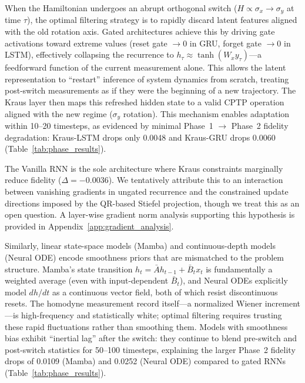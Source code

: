 \documentclass{article} %
\begin{document}
When the Hamiltonian undergoes an abrupt orthogonal switch ($H \propto \sigma_x \to \sigma_y$ at time $\tau$), the optimal filtering strategy is to rapidly discard latent features aligned with the old rotation axis. Gated architectures achieve this by driving gate activations toward extreme values (reset gate $\to 0$ in GRU, forget gate $\to 0$ in LSTM), effectively collapsing the recurrence to $h_\tau \approx \tanh(W_x y_\tau)$---a feedforward function of the current measurement alone. This allows the latent representation to ``restart'' inference of system dynamics from scratch, treating post-switch measurements as if they were the beginning of a new trajectory. The Kraus layer then maps this refreshed hidden state to a valid CPTP operation aligned with the new regime ($\sigma_y$ rotation). This mechanism enables adaptation within 10--20 timesteps, as evidenced by minimal Phase~1 $\to$ Phase~2 fidelity degradation: Kraus-LSTM drops only 0.0048 and Kraus-GRU drops 0.0060 (Table~\ref{tab:phase_results}).

The Vanilla RNN is the sole architecture where Kraus constraints 
marginally reduce fidelity ($\Delta = -0.0036$). We tentatively attribute this to an interaction between vanishing gradients in ungated recurrence and the constrained update directions imposed by the QR-based Stiefel projection, though we treat this as an open question. A layer-wise gradient norm analysis supporting this hypothesis is provided in 
Appendix~\ref{app:gradient_analysis}.

Similarly, linear state-space models (Mamba) and continuous-depth models (Neural ODE) encode smoothness priors that are mismatched to the problem structure. Mamba's state transition $h_t = \bar{A}h_{t-1} + \bar{B}_t x_t$ is fundamentally a weighted average (even with input-dependent $\bar{B}_t$), and Neural ODEs explicitly model $dh/dt$ as a continuous vector field, both of which resist discontinuous resets. The homodyne measurement record itself---a normalized Wiener increment---is high-frequency and statistically white; optimal filtering requires trusting these rapid fluctuations rather than smoothing them. Models with smoothness bias exhibit ``inertial lag'' after the switch: they continue to blend pre-switch and post-switch statistics for 50--100 timesteps, explaining the larger Phase~2 fidelity drops of 0.0109 (Mamba) and 0.0252 (Neural ODE) compared to gated RNNs (Table~\ref{tab:phase_results}).
\end{document}
